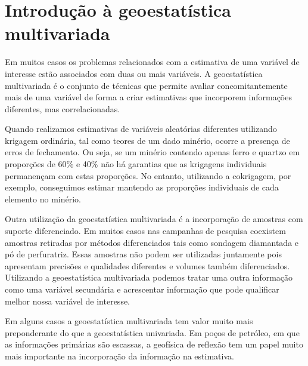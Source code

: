 \appendix


\chapter{Introdução à geoestatística multivariada}

Em muitos casos os problemas relacionados com a estimativa de uma variável de interesse estão associados com duas ou mais variáveis. A geoestatística multivariada é o conjunto de técnicas que permite avaliar concomitantemente  mais de uma variável de forma a criar estimativas que incorporem informações diferentes, mas correlacionadas. 

Quando realizamos estimativas de variáveis aleatórias diferentes utilizando krigagem ordinária, tal como teores de um dado minério, ocorre a presença de erros de fechamento. Ou seja, se um minério contendo apenas ferro e quartzo em proporções de 60$\%$ e 40$\% $ não há garantias que as krigagens individuais permanençam com estas proporções. No entanto, utilizando a cokrigagem, por exemplo, conseguimos estimar mantendo as proporções individuais de cada elemento no minério. 

Outra utilização da geoestatística multivariada é a incorporação de amostras com suporte diferenciado. Em muitos casos nas campanhas de pesquisa coexistem amostras retiradas por métodos diferenciados tais como sondagem diamantada e pó de perfuratriz. Essas amostras não podem ser utilizadas juntamente pois apresentam precisões e qualidades diferentes e volumes também diferenciados. Utilizando a geoestatística multivariada podemos tratar uma outra informação como uma variável secundária e acrescentar informação que pode qualificar melhor nossa variável de interesse. 

Em alguns casos a geoestatística multivariada tem valor muito mais preponderante do que a geoestatística univariada. Em poços de petróleo, em que as informações primárias são escassas, a geofísica de reflexão tem um papel muito mais importante na incorporação da informação na estimativa.

